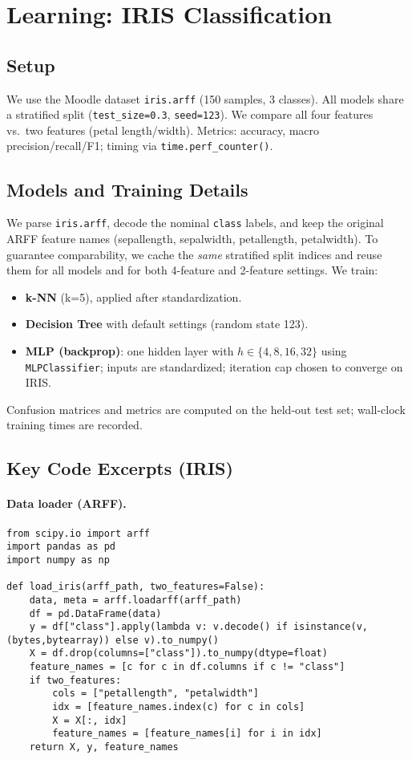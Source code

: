 \documentclass[11pt,a4paper]{article}
\begin{document}
\section{Learning: IRIS Classification}

\subsection{Setup}
We use the Moodle dataset \verb|iris.arff| (150 samples, 3 classes). All models share a stratified split (\verb|test_size=0.3|, \verb|seed=123|). We compare all four features vs.\ two features (petal length/width). Metrics: accuracy, macro precision/recall/F1; timing via \verb|time.perf_counter()|.

\subsection{Models and Training Details}
We parse \verb|iris.arff|, decode the nominal \verb|class| labels, and keep the original ARFF feature names (sepallength, sepalwidth, petallength, petalwidth). To guarantee comparability, we cache the \emph{same} stratified split indices and reuse them for all models and for both 4-feature and 2-feature settings. We train:
\begin{itemize}
  \item \textbf{k-NN} (k=5), applied after standardization.
  \item \textbf{Decision Tree} with default settings (random state 123).
  \item \textbf{MLP (backprop)}: one hidden layer with $h\in\{4,8,16,32\}$ using \texttt{MLPClassifier}; inputs are standardized; iteration cap chosen to converge on IRIS.
\end{itemize}
Confusion matrices and metrics are computed on the held-out test set; wall-clock training times are recorded.

\subsection*{Key Code Excerpts (IRIS)}

\paragraph{Data loader (ARFF).}
\begin{lstlisting}[style=mypython,caption={Load IRIS from ARFF and optionally keep two petal features},label={lst:iris-loader}]
from scipy.io import arff
import pandas as pd
import numpy as np

def load_iris(arff_path, two_features=False):
    data, meta = arff.loadarff(arff_path)
    df = pd.DataFrame(data)
    y = df["class"].apply(lambda v: v.decode() if isinstance(v,(bytes,bytearray)) else v).to_numpy()
    X = df.drop(columns=["class"]).to_numpy(dtype=float)
    feature_names = [c for c in df.columns if c != "class"]
    if two_features:
        cols = ["petallength", "petalwidth"]
        idx = [feature_names.index(c) for c in cols]
        X = X[:, idx]
        feature_names = [feature_names[i] for i in idx]
    return X, y, feature_names
\end{lstlisting}
\end{document}
